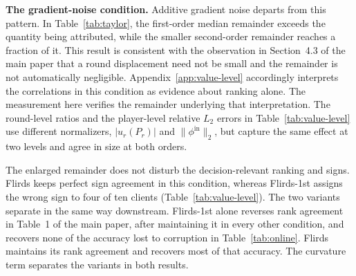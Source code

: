 \documentclass[letterpaper]{article} %
\theoremstyle{definition}
\begin{document}
\noindent\textbf{The gradient-noise condition.} Additive gradient noise departs from
this pattern. In Table~\ref{tab:taylor}, the first-order median remainder
exceeds the quantity being attributed, while the smaller second-order remainder
reaches a fraction of it.
This result is consistent with the observation in Section~4.3 of the main paper
that a round displacement need not be small and the remainder is not
automatically negligible. Appendix~\ref{app:value-level} accordingly
interprets the correlations in this condition as evidence about ranking
alone. The measurement here verifies the remainder underlying that
interpretation. The round-level ratios and the player-level relative $L_2$
errors in Table~\ref{tab:value-level} use different normalizers,
$|u_r(P_r)|$ and $\|\phi^{\mathrm{in}}\|_2$, but capture the same effect at two
levels and agree in size at both orders.

The enlarged remainder does not disturb the decision-relevant ranking and
signs. Flirds keeps perfect sign agreement in this condition, whereas
Flirds-1st assigns the wrong sign to four of ten clients
(Table~\ref{tab:value-level}). The two variants separate in the same way
downstream. Flirds-1st alone reverses rank agreement in
Table~1 of the main paper, after maintaining it in every other
condition, and recovers none of the
accuracy lost to corruption in Table~\ref{tab:online}. Flirds maintains its
rank agreement and recovers most of that accuracy. The curvature term
separates the variants in both results.
\end{document}
